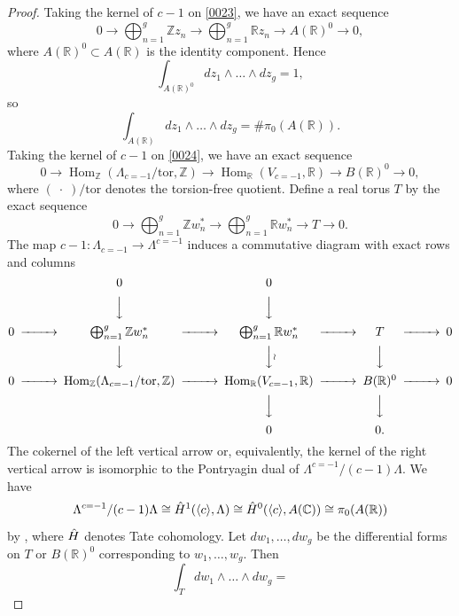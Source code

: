 \documentclass{amsart}
\theoremstyle{remark}
\numberwithin{equation}{section}
\newcommand{\genby}[1]{\langle #1 \rangle}
\newcommand{\Z}{\mathbb{Z}}
\newcommand{\R}{\mathbb{R}}
\newcommand{\C}{\mathbb{C}}
\newcommand{\tor}{\mathrm{tor}}
\newcommand{\var}{\;\cdot\;}
\DeclareMathOperator{\Hom}{Hom}
\begin{document}
\begin{proof}
	Taking the kernel of $c - 1$ on \eqref{0023},
	we have an exact sequence
		\[
				0
			\to
				\bigoplus_{n = 1}^{g}
					\Z z_{n}
			\to
				\bigoplus_{n = 1}^{g}
					\R z_{n}
			\to
				A(\R)^{0}
			\to
				0,
		\]
	where $A(\R)^{0} \subset A(\R)$ is the identity component.
	Hence
		\[
				\int_{A(\R)^{0}}
					d z_{1} \wedge \dots \wedge d z_{g}
			=
				1,
		\]
	so
		\begin{equation} \label{0027}
				\int_{A(\R)}
					d z_{1} \wedge \dots \wedge d z_{g}
			=
				\# \pi_{0}(A(\R)).
		\end{equation}
	Taking the kernel of $c - 1$ on \eqref{0024},
	we have an exact sequence
		\[
				0
			\to
				\Hom_{\Z}(\Lambda_{c = -1} / \tor, \Z)
			\to
				\Hom_{\R}(V_{c = - 1}, \R)
			\to
				B(\R)^{0}
			\to
				0,
		\]
	where $(\var) / \tor$ denotes the torsion-free quotient.
	Define a real torus $T$ by the exact sequence
		\[
				0
			\to
				\bigoplus_{n = 1}^{g}
					\Z w_{n}^{\ast}
			\to
				\bigoplus_{n = 1}^{g}
					\R w_{n}^{\ast}
			\to
				T
			\to
				0.
		\]
	The map $c - 1 \colon \Lambda_{c = -1} \to \Lambda^{c = -1}$
	induces a commutative diagram with exact rows and columns
		\[
			\begin{CD}
				@.
					0
				@.
					0
				\\ @. @VVV @VVV \\
					0
				@>>>
					\bigoplus_{n = 1}^{g}
						\Z w_{n}^{\ast}
				@>>>
					\bigoplus_{n = 1}^{g}
						\R w_{n}^{\ast}
				@>>>
					T
				@>>>
					0
				\\ @. @VVV @VV \wr V @VVV \\
					0
				@>>>
					\Hom_{\Z}(\Lambda_{c = -1} / \tor, \Z)
				@>>>
					\Hom_{\R}(V_{c = - 1}, \R)
				@>>>
					B(\R)^{0}
				@>>>
					0
				\\ @. @. @VVV @VVV \\
				@.
				@.	
					0
				@.
					0.
			\end{CD}
		\]
	The cokernel of the left vertical arrow
	or, equivalently, the kernel of the right vertical arrow
	is isomorphic to the Pontryagin dual of
	$\Lambda^{c = -1} / (c - 1) \Lambda$.
	We have
		\[
				\Lambda^{c = -1} / (c - 1) \Lambda
			\cong
				\Hat{H}^{1}(\genby{c}, \Lambda)
			\cong
				\Hat{H}^{0}(\genby{c}, A(\C))
			\cong
				\pi_{0}(A(\R))
		\]
	by \cite[Chapter I, Remark 3.7]{Mil06},
	where $\Hat{H}$ denotes Tate cohomology.
	Let $d w_{1}, \dots, d w_{g}$ be the differential forms on
	$T$ or $B(\R)^{0}$ corresponding to $w_{1}, \dots, w_{g}$.
	Then
		\[
				\int_{T}
					d w_{1} \wedge \dots \wedge d w_{g}
			=
\]
\end{proof}
\end{document}
